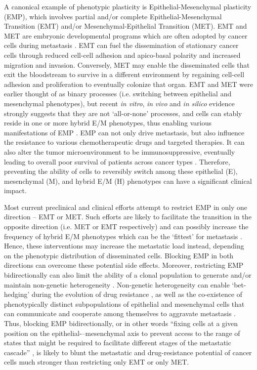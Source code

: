 \documentclass[preprint,review,12pt]{elsarticle}
\begin{document}
	A canonical example of phenotypic plasticity is Epithelial-Mesenchymal plasticity (EMP), which involves partial and/or complete Epithelial-Mesenchymal Transition (EMT) and/or Mesenchymal-Epithelial Transition (MET). EMT and MET are embryonic developmental programs which are often adopted by cancer cells during metastasis \cite{Nieto2016}. EMT can fuel the dissemination of stationary cancer cells through reduced cell-cell adhesion and apico-basal polarity and increased migration and invasion. Conversely, MET may enable the disseminated cells that exit the bloodstream to survive in a different environment by regaining cell-cell adhesion and proliferation to eventually colonize that organ. EMT and MET were earlier thought of as binary processes (i.e. switching between epithelial and mesenchymal phenotypes), but recent \textit{in vitro}, \textit{in vivo} and \textit{in silico} evidence strongly suggests that they are not ‘all-or-none’ processes, and cells can stably reside in one or more hybrid E/M phenotypes, thus enabling various manifestations of EMP \cite{Nieto2016}. EMP can not only drive metastasis, but also influence the resistance to various chemotherapeutic drugs and targeted therapies. It can also alter the tumor microenvironment to be immunosuppressive, eventually leading to overall poor survival of patients across cancer types \cite{Dongre2018, Yuan2019}. Therefore, preventing the ability of cells to reversibly switch among these epithelial (E), mesenchymal (M), and hybrid E/M (H) phenotypes can have a significant clinical impact.
	
	Most current preclinical and clinical efforts attempt to restrict EMP in only one direction – EMT or MET. Such efforts are likely to facilitate the transition in the opposite direction (i.e. MET or EMT respectively) and can possibly increase the frequency of hybrid E/M phenotypes which can be the ‘fittest’ for metastasis \cite{Jolly2018}. Hence, these interventions may increase the metastatic load instead, depending on the phenotypic distribution of disseminated cells. Blocking EMP in both directions can overcome these potential side effects. Moreover, restricting EMP bidirectionally can also limit the ability of a clonal population to generate and/or maintain non-genetic heterogeneity \cite{Tripathi2019a}. Non-genetic heterogeneity can enable ‘bet-hedging’ during the evolution of drug resistance \cite{Salgia2018}, as well as the co-existence of phenotypically distinct subpopulations of epithelial and mesenchymal cells that can communicate and cooperate among themselves to aggravate metastasis \cite{Neelakantan2017, Tsuji2008}. Thus, blocking EMP bidirectionally, or in other words ``fixing cells at a given position on the epithelial-–mesenchymal axis to prevent access to the range of states that might be required to facilitate different stages of the metastatic cascade'' \cite{Williams2019}, is likely to blunt the metastatic and drug-resistance potential of cancer cells much stronger than restricting only EMT or only MET.
	
\end{document}
